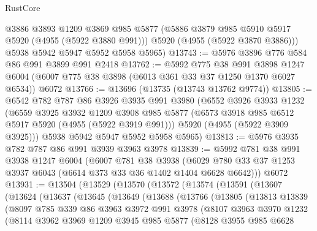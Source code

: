 \begin{lexlean}{RustCore}
\begin{coremodule}
        @3886
        @3893
        @1209
        @3869
        @985
        @5877
        (@5886 @3879 @985 @5910 @5917 @5920 (@4955 (@5922 @3880 @991)))
        @5920
        (@4955 (@5922 @3870 @3886)))
      @5938
      @5942
      @5947
      @5952
      @5958
      @5965)
@13743 := @5976 @3896 @776 @584 @86 @991 @3899 @991 @2418
@13762 := @5992
    @775
    @38
    @991
    @3898
    @1247
    @6004
    (@6007 @775 @38 @3898 (@6013 @361 @33 @37 @1250 @1370 @6027 @6534))
    @6072
@13766 := @13696 (@13735 (@13743 @13762 @9774))
@13805 := @6542
    @782
    @787
    @86
    @3926
    @3935
    @991
    @3980
    (@6552
      @3926
      @3933
      @1232
      (@6559
        @3925
        @3932
        @1209
        @3908
        @985
        @5877
        (@6573 @3918 @985 @6512 @5917 @5920 (@4955 (@5922 @3919 @991)))
        @5920
        (@4955 (@5922 @3909 @3925)))
      @5938
      @5942
      @5947
      @5952
      @5958
      @5965)
@13813 := @5976 @3935 @782 @787 @86 @991 @3939 @3963 @3978
@13839 := @5992
    @781
    @38
    @991
    @3938
    @1247
    @6004
    (@6007
      @781
      @38
      @3938
      (@6029 @780 @33 @37 @1253 @3937 @6043 (@6614 @373 @33 @36 @1402 @1404 @6628 @6642)))
    @6072
@13931 := @13504
    (@13529
      (@13570
        (@13572
          (@13574
            (@13591
              (@13607
                (@13624
                  (@13637
                    (@13645
                      (@13649
                        (@13688
                          (@13766
                            (@13805
                              (@13813
                                @13839
                                (@8097
                                  @785
                                  @339
                                  @86
                                  @3963
                                  @3972
                                  @991
                                  @3978
                                  (@8107
                                    @3963
                                    @3970
                                    @1232
                                    (@8114
                                      @3962
                                      @3969
                                      @1209
                                      @3945
                                      @985
                                      @5877
                                      (@8128
                                        @3955
                                        @985
                                        @6628

\end{coremodule}
\end{lexlean}
